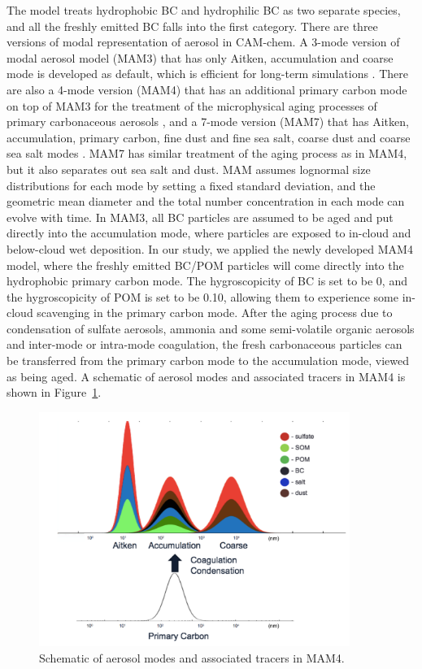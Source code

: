 \documentclass[12pt, fullpage]{uiucthesis2009}
\begin{document}
	
	The model treats hydrophobic BC and hydrophilic BC as two separate species, and all the freshly emitted BC falls into the first category. There are three versions of modal representation of aerosol in CAM-chem. A 3-mode version of modal aerosol model (MAM3) that has only Aitken, accumulation and coarse mode is developed as default, which is efficient for long-term simulations \citep{Liu2012}. There are also a 4-mode version (MAM4) that has an additional primary carbon mode on top of MAM3 for the treatment of the microphysical aging processes of primary carbonaceous aerosols \citep{Liu2016}, and a 7-mode version (MAM7) that has Aitken, accumulation, primary carbon, fine dust and fine sea salt, coarse dust and coarse sea salt modes \citep{Liu2012}. MAM7 has similar treatment of the aging process as in MAM4, but it also separates out sea salt and dust. MAM assumes lognormal size distributions for each mode by setting a fixed standard deviation, and the geometric mean diameter and the total number concentration in each mode can evolve with time. In MAM3, all BC particles are assumed to be aged and put directly into the accumulation mode, where particles are exposed to in-cloud and below-cloud wet deposition. In our study, we applied the newly developed MAM4 model, where the freshly emitted BC/POM particles will come directly into the hydrophobic primary carbon mode. The hygroscopicity of BC is set to be 0, and the hygroscopicity of POM is set to be 0.10, allowing them to experience some in-cloud scavenging in the primary carbon mode. After the aging process due to condensation of sulfate aerosols, ammonia and some semi-volatile organic aerosols and inter-mode or intra-mode coagulation, the fresh carbonaceous particles can be transferred from the primary carbon mode to the accumulation mode, viewed as being aged. A schematic of aerosol modes and associated tracers in MAM4 is shown in Figure~\ref{fig_P1}.
	\begin{figure}[h] 
		\begin{center}
			\includegraphics[width = 0.9\textwidth]{Figure01}
			\caption[Schematic of aerosol modes and associated tracers in MAM4]{\label{fig_P1} Schematic of aerosol modes and associated tracers in MAM4.}
		\end{center}
	\end{figure}
	
\end{document}
